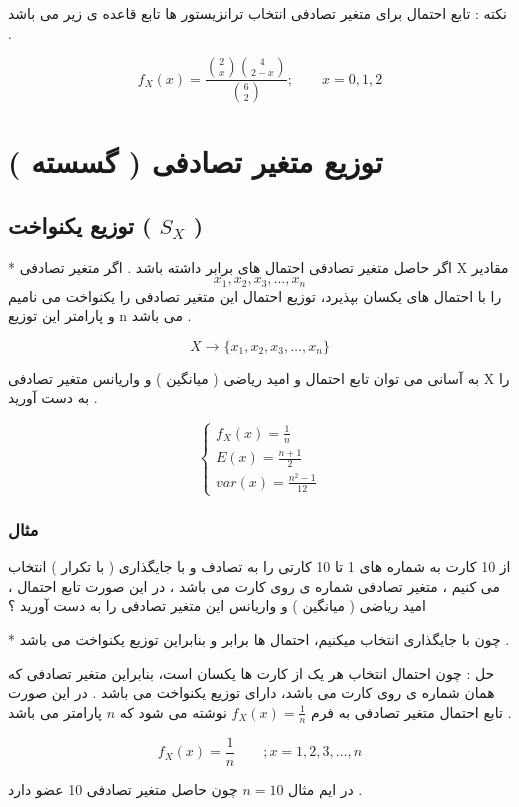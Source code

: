 \documentclass[12pt]{book}
\begin{document}
نکته : تابع احتمال برای متغیر تصادفی انتخاب ترانزیستور ها تابع قاعده ی زیر می باشد .

$$
f_{X}(x) = \frac{\binom{2}{x} \binom{4}{2-x}}{\binom{6}{2}} ; \qquad x = 0 , 1 , 2 
$$


\section{توزیع متغیر تصادفی ( گسسته )}

\subsection{توزیع یکنواخت ( $S_{X}$ )}

* اگر حاصل متغیر تصادفی احتمال های برابر داشته باشد .
اگر متغیر تصادفی X مقادیر 
$$
x_{1}, x_{2}, x_{3} , \dots , x_{n}
$$
را با احتمال های یکسان بپذیرد، توزیع احتمال این متغیر تصادفی را یکنواخت می نامیم و پارامتر این توزیع n می باشد .

$$
X \to \{ x_{1}, x_{2}, x_{3} , \dots , x_{n} \}
$$

به آسانی می توان تابع احتمال و امید ریاضی ( میانگین ) و واریانس متغیر تصادفی X را به دست آورید .

$$
\begin{cases}
f_{X}(x) = \frac{1}{n} \\
E(x) = \frac{n+1}{2} \\
var(x) = \frac{n^{2}-1}{12}
\end{cases}
$$



\subsubsection{مثال}
از 10 کارت به شماره های 1 تا 10 کارتی را به تصادف و با جایگذاری ( با تکرار ) انتخاب می کنیم ، متغیر تصادفی شماره ی روی کارت می باشد ، در این صورت تابع احتمال ، امید ریاضی ( میانگین ) و واریانس این متغیر تصادفی را به دست آورید ؟


* چون با جایگذاری انتخاب میکنیم، احتمال ها برابر و بنابراین توزیع یکنواخت می باشد .

حل : چون احتمال انتخاب هر یک از کارت ها یکسان است، بنابراین متغیر تصادفی که همان شماره ی روی کارت می باشد، دارای توزیع یکنواخت می باشد . در این صورت تابع احتمال متغیر تصادفی به فرم $f_{X}(x) = \frac{1}{n}$ نوشته می شود که $n$ پارامتر می باشد .

$$
f_{X}(x) = \frac{1}{n} \qquad ; x = 1 , 2 , 3 , \dots , n
$$

در ایم مثال
 $n=10$
  چون حاصل متغیر تصادفی 10 عضو دارد .
\end{document}
